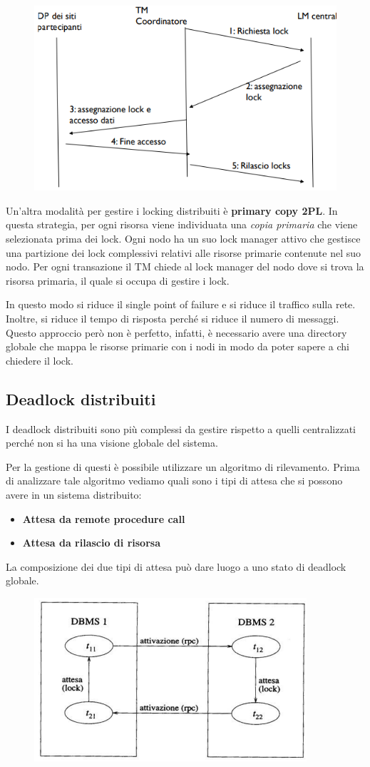 \begin{figure}
    \centering
    \includegraphics[width=.5\textwidth]{img/DDBMS/centralized_2PL.png}
\end{figure}

Un'altra modalità per gestire i locking distribuiti è \textbf{primary copy 2PL}.
In questa strategia, per ogni risorsa viene individuata una \textit{copia primaria}
che viene selezionata prima dei lock. Ogni nodo ha un suo lock manager attivo che
gestisce una partizione dei lock complessivi relativi alle risorse primarie
contenute nel suo nodo. Per ogni transazione il TM chiede al lock manager del nodo
dove si trova la risorsa primaria, il quale si occupa di gestire i lock.

In questo modo si riduce il single point of failure e si riduce il traffico
sulla rete. Inoltre, si riduce il tempo di risposta perché si riduce il numero
di messaggi. Questo approccio però non è perfetto, infatti, è necessario avere
una directory globale che mappa le risorse primarie con i nodi in modo da poter
sapere a chi chiedere il lock.

\subsection{Deadlock distribuiti}
I deadlock distribuiti sono più complessi da gestire rispetto a quelli centralizzati
perché non si ha una visione globale del sistema.

Per la gestione di questi è possibile utilizzare un algoritmo di rilevamento.
Prima di analizzare tale algoritmo vediamo quali sono i tipi di attesa che
si possono avere in un sistema distribuito:
\begin{itemize}
    \item \textbf{Attesa da remote procedure call}
    \item \textbf{Attesa da rilascio di risorsa}
\end{itemize}
La composizione dei due tipi di attesa può dare luogo a uno stato di deadlock
globale.

\begin{figure}
    \centering
    \includegraphics[width=.5\textwidth]{img/DDBMS/deadlock_distribuito.png}
\end{figure}

